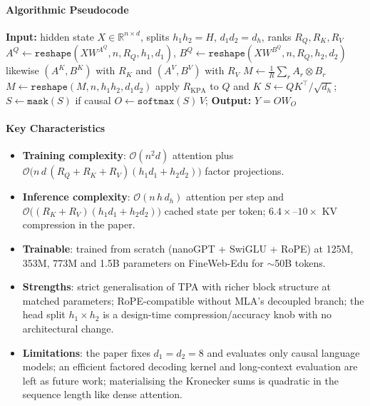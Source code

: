 \paragraph{Algorithmic Pseudocode}
\begin{algorithmic}[1]
\State \textbf{Input:} hidden state $X\in\mathbb{R}^{n\times d}$, splits $h_1 h_2 = H$, $d_1 d_2 = d_h$, ranks $R_Q, R_K, R_V$
\State $A^Q \gets \texttt{reshape}(X W^{A^Q}, n, R_Q, h_1, d_1)$, \quad $B^Q \gets \texttt{reshape}(X W^{B^Q}, n, R_Q, h_2, d_2)$
\State likewise $(A^K,B^K)$ with $R_K$ and $(A^V,B^V)$ with $R_V$ 
    \State $M \gets \frac{1}{R}\sum_{r} A_r \otimes B_r$ 
    \State $M \gets \texttt{reshape}(M, n, h_1 h_2, d_1 d_2)$ 
\EndFor
\State apply $R_{\mathrm{KPA}}$ to $Q$ and $K$ 
\State $S \gets QK^{\top}/\sqrt{d_h}$; \quad $S \gets \texttt{mask}(S)$ if causal
\State $O \gets \texttt{softmax}(S)\,V$; \quad \textbf{Output:} $Y = O W_O$
\end{algorithmic}

\paragraph{Key Characteristics}
\begin{itemize}[leftmargin=*]
    \item \textbf{Training complexity}: $\mathcal{O}(n^2 d)$ attention plus $\mathcal{O}\big(n\,d\,(R_Q+R_K+R_V)(h_1d_1+h_2d_2)\big)$ factor projections.
    \item \textbf{Inference complexity}: $\mathcal{O}(n\,h\,d_h)$ attention per step and $\mathcal{O}\big((R_K+R_V)(h_1d_1+h_2d_2)\big)$ cached state per token; $6.4\times$--$10\times$ KV compression in the paper.
    \item \textbf{Trainable}: trained from scratch (nanoGPT + SwiGLU + RoPE) at 125M, 353M, 773M and 1.5B parameters on FineWeb-Edu for $\sim$50B tokens.
    \item \textbf{Strengths}: strict generalisation of TPA with richer block structure at matched parameters; RoPE-compatible without MLA's decoupled branch; the head split $h_1\times h_2$ is a design-time compression/accuracy knob with no architectural change.
    \item \textbf{Limitations}: the paper fixes $d_1=d_2=8$ and evaluates only causal language models; an efficient factored decoding kernel and long-context evaluation are left as future work; materialising the Kronecker sums is quadratic in the sequence length like dense attention.
\end{itemize}

